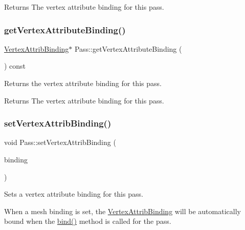 \begin{DoxyReturn}{Returns}
The vertex attribute binding for this pass. 
\end{DoxyReturn}
\mbox{\label{classPass_a7fec50d8717f63c4e1520d2edee2e789}} 
\subsubsection{\texorpdfstring{get\+Vertex\+Attribute\+Binding()}{getVertexAttributeBinding()}\hspace{0.1cm}{\footnotesize\ttfamily [2/2]}}
{\footnotesize\ttfamily \hyperlink{classVertexAttribBinding}{Vertex\+Attrib\+Binding}$\ast$ Pass\+::get\+Vertex\+Attribute\+Binding (\begin{DoxyParamCaption}{ }\end{DoxyParamCaption}) const}

Returns the vertex attribute binding for this pass.

\begin{DoxyReturn}{Returns}
The vertex attribute binding for this pass. 
\end{DoxyReturn}
\mbox{\label{classPass_a611219b345c8a97b89d13fa1589fe87c}} 
\subsubsection{\texorpdfstring{set\+Vertex\+Attrib\+Binding()}{setVertexAttribBinding()}\hspace{0.1cm}{\footnotesize\ttfamily [1/2]}}
{\footnotesize\ttfamily void Pass\+::set\+Vertex\+Attrib\+Binding (\begin{DoxyParamCaption}\item[{\hyperlink{classVertexAttribBinding}{Vertex\+Attrib\+Binding} $\ast$}]{binding }\end{DoxyParamCaption})}

Sets a vertex attribute binding for this pass.

When a mesh binding is set, the \hyperlink{classVertexAttribBinding}{Vertex\+Attrib\+Binding} will be automatically bound when the \hyperlink{classPass_a61f3c6e7b46c51555c43d97619a13630}{bind()} method is called for the pass.


